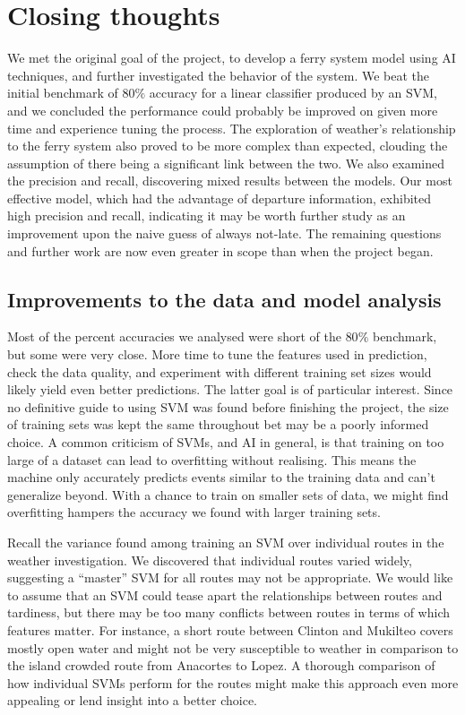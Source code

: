 \documentclass[11pt]{article} %
\begin{document}
\section{Closing thoughts}
\label{sec:summary}
We met the original goal of the project, to develop a ferry system model using AI 
techniques, and further investigated the behavior of the
system. We beat the initial benchmark of $80\%$ accuracy for a linear classifier 
produced by an SVM, and we concluded the performance could probably be improved
on given more time and experience tuning the process. The exploration of weather's
relationship to the ferry system also proved to be more complex than expected, 
clouding the assumption of there being a significant link between the two. We 
also examined the precision and recall, discovering mixed results between the 
models. Our most effective model, which had the advantage of departure information,
exhibited high precision and recall, indicating it may be worth further study
as an improvement upon the naive guess of always not-late. The remaining 
questions and further work are now even greater in scope than when the 
project began.

\subsection{Improvements to the data and model analysis}
\label{sec:improvements}
Most of the percent accuracies we analysed were short of the $80\%$ benchmark,
but some were very close. More time to tune the features used in prediction, 
check the data quality, and experiment with different training set sizes would
likely yield even better predictions. The latter goal is of particular interest.
Since no definitive guide to using SVM was found before finishing the project, 
the size of training sets was kept the same throughout bet may be a poorly informed
choice. A common criticism of SVMs, and AI in general, is that training on too
large of a dataset can lead to overfitting without realising. This means the
machine only accurately predicts events similar to the training data
and can't generalize beyond. With a chance to train on smaller sets of data,
we might find overfitting hampers the accuracy we found with larger training sets.

Recall the variance found among training an SVM over individual routes in the 
weather investigation. We discovered that individual routes varied widely, 
suggesting a 
``master'' SVM for all routes may not be appropriate. We would like to assume that
an SVM could tease apart the relationships between routes and tardiness, but there
may be too many conflicts between routes in terms of which features matter. For 
instance, a short route between Clinton and Mukilteo covers mostly open water
and might not be very susceptible to weather in comparison to the island crowded
route from Anacortes to Lopez. A thorough comparison of how individual SVMs 
perform for the routes might make this approach even more appealing or lend 
insight into a better choice.
\end{document}
